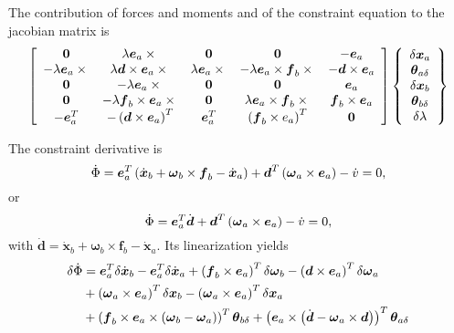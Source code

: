 \documentclass[10pt,dvips,fleqn]{report}
\newcommand{\T}[1]{\boldsymbol{#1}}
\begin{document}
The contribution of forces and moments and of the constraint equation 
to the jacobian matrix is
\begin{equation}
	\sqbr{\matr{ccccc}{
		\T{0} & \lambda \T{e}_a \times{} & \T{0} & \T{0} & - \T{e}_a \\
		- \lambda \T{e}_a \times{} & \lambda \T{d}\times\T{e}_a\times{} & 
			\lambda \T{e}_a \times{} & - \lambda \T{e}_a \times \T{f}_b\times{} &
			- \T{d}\times\T{e}_a \\
		\T{0} & - \lambda \T{e}_a \times{} & \T{0} & \T{0} & \T{e}_a \\
		\T{0} & - \lambda \T{f}_b \times \T{e}_a \times{} &
			\T{0} & \lambda \T{e}_a\times\T{f}_b\times{} & \T{f}_b\times\T{e}_a \\
		- \T{e}_a^T & - \plbr{\T{d} \times \T{e}_a}^T &
			\T{e}_a^T & \plbr{\T{f}_b\times{e}_a}^T & \T{0}
	}}\cubr{\cvvect{
		\delta\T{x}_a \\
		\T{\theta}_{a\delta} \\
		\delta\T{x}_b \\
		\T{\theta}_{b\delta} \\
		\delta\lambda
	}}
\end{equation}

The constraint derivative is
\begin{equation}
	\dot{\Phi} = \T{e}_a^T\plbr{
		\dot{\T{x}}_b
		+ \T{\omega}_b \times \T{f}_b
		- \dot{\T{x}}_a
	} + \T{d}^T \plbr{\T{\omega}_a \times \T{e}_a} - \dot{v} = 0 ,
\end{equation}
or
\begin{equation}
	\dot{\Phi} = \T{e}_a^T \dot{\T{d}}
	+ \T{d}^T \plbr{\T{\omega}_a \times \T{e}_a} - \dot{v} = 0 ,
\end{equation}
with $\dot{\T{d}}=\dot{\T{x}}_b+\T{\omega}_b\times\T{f}_b-\dot{\T{x}}_a$.
Its linearization yields
\begin{align}
	\delta\dot{\Phi} &= \T{e}_a^T \delta\dot{\T{x}}_b
	- \T{e}_a^T \delta\dot{\T{x}}_a
	+ \plbr{\T{f}_b \times \T{e}_a}^T \delta\T{\omega}_b
	- \plbr{\T{d} \times \T{e}_a}^T \delta\T{\omega}_a \nonumber \\
	& + \plbr{\T{\omega}_a \times \T{e}_a}^T \delta\T{x}_b
	- \plbr{\T{\omega}_a \times \T{e}_a}^T \delta\T{x}_a \nonumber \\
	& + \plbr{\T{f}_b \times \T{e}_a \times \plbr{\T{\omega}_b - \T{\omega}_a}}^T \T{\theta}_{b\delta}
	+ \plbr{\T{e}_a \times \plbr{\dot{\T{d}} - \T{\omega}_a \times \T{d}}}^T \T{\theta}_{a\delta}
\end{align}
\end{document}
